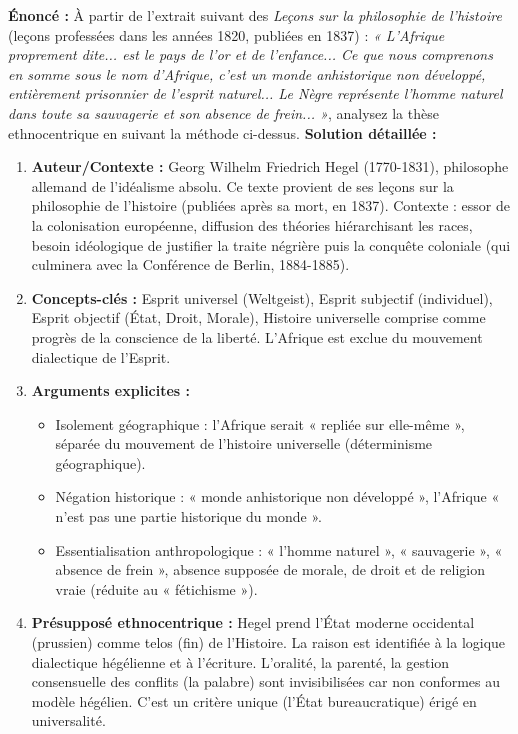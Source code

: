 \documentclass[11pt]{article}
\newcommand{\cle}[1]{{\popxbold\color{popdark}#1}}
\begin{document}
\begin{exoresolu}
\textbf{Énoncé :} À partir de l'extrait suivant des \emph{Leçons sur la philosophie de l'histoire} (leçons professées dans les années 1820, publiées en 1837) : \emph{« L'Afrique proprement dite... est le pays de l'or et de l'enfance... Ce que nous comprenons en somme sous le nom d'Afrique, c'est un monde anhistorique non développé, entièrement prisonnier de l'esprit naturel... Le Nègre représente l'homme naturel dans toute sa sauvagerie et son absence de frein... »}, analysez la thèse ethnocentrique en suivant la méthode ci-dessus.
\tcblower
\textbf{Solution détaillée :}
\begin{enumerate}
    \item \textbf{Auteur/Contexte :} Georg Wilhelm Friedrich Hegel (1770-1831), philosophe allemand de l'idéalisme absolu. Ce texte provient de ses leçons sur la philosophie de l'histoire (publiées après sa mort, en 1837). Contexte : essor de la colonisation européenne, diffusion des théories hiérarchisant les races, besoin idéologique de justifier la traite négrière puis la conquête coloniale (qui culminera avec la Conférence de Berlin, 1884-1885).
    \item \textbf{Concepts-clés :} \cle{Esprit universel} (Weltgeist), \cle{Esprit subjectif} (individuel), \cle{Esprit objectif} (État, Droit, Morale), \cle{Histoire universelle} comprise comme progrès de la conscience de la liberté. L'Afrique est exclue du mouvement dialectique de l'Esprit.
    \item \textbf{Arguments explicites :}
        \begin{itemize}
            \item Isolement géographique : l'Afrique serait « repliée sur elle-même », séparée du mouvement de l'histoire universelle (déterminisme géographique).
            \item Négation historique : « monde anhistorique non développé », l'Afrique « n'est pas une partie historique du monde ».
            \item Essentialisation anthropologique : « l'homme naturel », « sauvagerie », « absence de frein », absence supposée de morale, de droit et de religion vraie (réduite au « fétichisme »).
        \end{itemize}
    \item \textbf{Présupposé ethnocentrique :} Hegel prend l'\cle{État moderne occidental} (prussien) comme telos (fin) de l'Histoire. La \cle{raison} est identifiée à la \cle{logique dialectique hégélienne} et à l'\cle{écriture}. L'oralité, la parenté, la gestion consensuelle des conflits (la palabre) sont invisibilisées car non conformes au modèle hégélien. C'est un \cle{critère unique} (l'État bureaucratique) érigé en universalité.

\end{enumerate}
\end{exoresolu}
\end{document}
